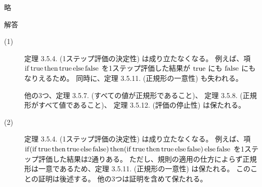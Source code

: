 \begin{jexercise*}[3.5.13]
  略
\end{jexercise*}
\begin{itembox}[l]{解答}
  \begin{description}
    \item[(1)]
      定理 3.5.4. (1ステップ評価の決定性) は成り立たなくなる。
      例えば、項 $\operatorname{if} \operatorname{true} \operatorname{then} \operatorname{true} \operatorname{else} \operatorname{false}$ を1ステップ評価した結果が $\operatorname{true}$ にも $\operatorname{false}$ にもなりえるため。
      同時に、定理 3.5.11. (正規形の一意性) も失われる。

      他の3つ、定理 3.5.7. (すべての値が正規形であること)、
      定理 3.5.8. (正規形がすべて値であること)、
      定理 3.5.12. (評価の停止性) は保たれる。
    \item[(2)]
      定理 3.5.4. (1ステップ評価の決定性) は成り立たなくなる。
      例えば、項
      $
        \operatorname{if}
          (\operatorname{if} \operatorname{true}
            \operatorname{then} \operatorname{true}
            \operatorname{else} \operatorname{false}
          )
        \operatorname{then}
          (\operatorname{if} \operatorname{true}
            \operatorname{then} \operatorname{true}
            \operatorname{else} \operatorname{false}
          )
        \operatorname{else} \operatorname{false}
      $
      を1ステップ評価した結果は2通りある。
      ただし、規則の適用の仕方によらず正規形は一意であるため、定理 3.5.11. (正規形の一意性) は保たれる。
      このことの証明は後述する。
      他の3つは証明を含めて保たれる。
  \end{description}
\end{itembox}

